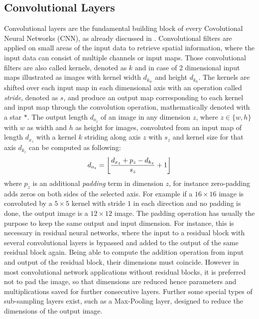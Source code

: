 
\subsection{Convolutional Layers}\label{sec:nn_theory_cnn}
Convolutional layers are the fundamental building block of every Covolutional Neural Networks (CNN), as already discussed in .
Convolutional filters are applied on small areas of the input data to retrieve spatial information, where the input data can consist of multiple channels or input maps.
Those convolutional filters are also called kernels, denoted as $k$ and in case of 2 dimensional input maps illustrated as images with kernel width $d_{k_w}$ and height $d_{k_h}$.
The kernels are shifted over each input map in each dimensional axis with an operation called \emph{stride}, denoted as $s$, and produce an output map corresponding to each kernel and input map through the convolution operation, mathematically denoted with a star $\ast$.
The output length $d_{o_z}$ of an image in any dimension $z$, where $z \in \{w, h\}$ with $w$ as width and $h$ as height for images, convoluted from an input map of length $d_{x_z}$ with a kernel $k$ striding along axis $z$ with $s_z$ and kernel size for that axis $d_{k_z}$ can be computed as following:
\begin{equation}\label{eq:nn_theory_cnn_}
  d_{o_z} = \floor*{\frac{d_{x_z} + p_z - d_{k_z}}{s_z} + 1}
\end{equation}
where $p_z$ is an additional \emph{padding} term in dimension $z$, for instance zero-padding adds zeros on both sides of the selected axis.
For example if a $16 \times 16$ image is convoluted by a $5 \times 5$ kernel with stride $1$ in each direction and no padding is done, the output image is a $12 \times 12$ image.
The padding operation has usually the purpose to keep the same output and input dimension.
For instance, this is necessary in residual neural networks, where the input to a residual block with several convolutional layers is bypassed and added to the output of the same residual block again.
Being able to compute the addition operation from input and output of the residual block, their dimensions must coincide.
However in most convolutional network applications without residual blocks, it is preferred not to pad the image, so that dimensions are reduced hence parameters and multiplications saved for further consecutive layers.
Further some special types of sub-sampling layers exist, such as a Max-Pooling layer, designed to reduce the dimensions of the output image.

